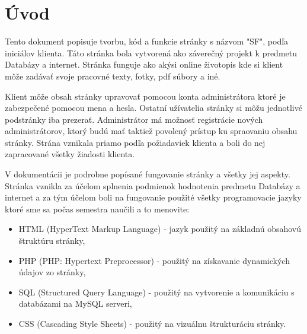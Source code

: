 \chapter*{Úvod}
\label{UVOD}

    Tento dokument popisuje tvorbu, kód a funkcie stránky s názvom "SF", podľa iniciálov klienta. Táto stránka bola vytvorená
ako záverečný projekt k predmetu Databázy a internet. Stránka funguje ako akýsi online životopis kde si klient môže zadávať svoje pracovné texty, fotky, pdf súbory a iné.

Klient môže obsah stránky upravovať pomocou konta administrátora ktoré je zabezpečené pomocou mena a hesla. Ostatní užívatelia stránky si môžu jednotlivé podstránky iba prezerať. Administrátor má možnosť registrácie nových administrátorov, ktorý budú mať taktiež povolený prístup ku spraovaniu obsahu stránky. Strána vznikala priamo podľa požiadaviek klienta a boli do nej zapracované všetky žiadosti klienta.

V dokumentácii je podrobne popísané fungovanie stránky a všetky jej aspekty. Stránka vznikla za účelom splnenia podmienok hodnotenia predmetu Databázy a internet a za tým účelom boli na fungovanie použité všetky programovacie jazyky ktoré sme sa počas semestra naučili a to menovite:

\begin{itemize}
\item HTML (HyperText Markup Language) - jazyk použitý na základnú obsahovú štruktúru stránky,
\item PHP (PHP: Hypertext Preprocessor) - použitý na získavanie dynamických údajov zo stránky,
\item SQL (Structured Query Language) - použitý na vytvorenie a komunikáciu s databázami na MySQL serveri,
\item CSS (Cascading Style Sheets) - použitý na vizuálnu štrukturáciu stránky.
\end{itemize}

